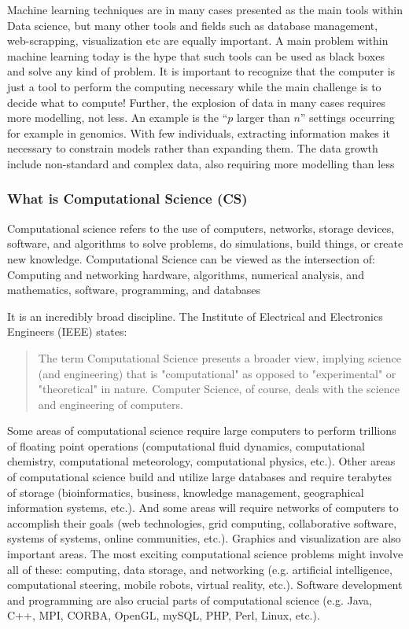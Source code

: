 \documentclass[a4paper,10pt]{article}
\begin{document}
Machine learning techniques are in many cases presented as the main tools within Data science, but many other tools and fields such as database management, web-scrapping, visualization etc are equally important. 
A main problem within machine learning today is the hype that such tools can be used as black boxes and solve any kind of problem. It is important to recognize that the computer is just a tool to perform the computing necessary while the main challenge is to decide what to compute!
Further, the explosion of data in many cases requires more modelling, not less. An example is the “$p$ larger than $n$” settings occurring for example in genomics. With few individuals, extracting information makes it necessary to constrain models rather than expanding them.
The data growth include non-standard and complex data, also requiring more modelling than less






 
\subsubsection*{What is Computational Science (CS)}
Computational science refers to the use of computers, networks, storage devices, software, and algorithms to solve problems, do simulations, build things, or create new knowledge. Computational Science can be viewed as the intersection of: 
Computing and networking hardware,
algorithms, numerical analysis, and mathematics,
software, programming, and databases

It is an incredibly broad discipline. The Institute of Electrical and Electronics Engineers (IEEE) states: 
\begin{quote}
The term Computational Science presents a broader view, implying science (and engineering) that is "computational" as opposed to "experimental" or "theoretical" in nature. Computer Science, of course, deals with the science and engineering of computers. 
\end{quote}
Some areas of computational science require large computers to perform trillions of floating point operations (computational fluid dynamics, computational chemistry, computational meteorology, computational physics, etc.). Other areas of computational science build and utilize large databases and require terabytes of storage (bioinformatics, business, knowledge management, geographical information systems, etc.). And some areas will require networks of computers to accomplish their goals (web technologies, grid computing, collaborative software, systems of systems, online communities, etc.). Graphics and visualization are also important areas. The most exciting computational science problems might involve all of these: computing, data storage, and networking (e.g. artificial intelligence, computational steering, mobile robots, virtual reality, etc.). Software development and programming are also crucial parts of computational science (e.g. Java, C++, MPI, CORBA, OpenGL, mySQL, PHP, Perl, Linux, etc.). 
\end{document}
